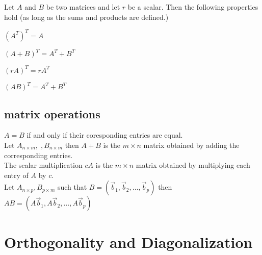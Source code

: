 \documentclass[5pt]{article}
\begin{document}
\begin{multicols}{2}
\begin{properties}
  Let $A$ and $B$ be two matrices and let $r$ be a scalar. Then the following properties hold (as long as the sums and products are defined.)
  \begin{itemize*}
    \item $(A^T)^T=A$
    \item $(A+B)^T=A^T+B^T$
    \item $(rA)^T=rA^T$
    \item $(AB)^T=A^T+B^T$
  \end{itemize*}
\end{properties}

\subsection{matrix operations}
$A=B$ if and only if their coresponding entries are equal.\\
Let $A_{n\times m},\;,B_{n\times m}$ then $A+B$ is the $m\times n$ matrix obtained by adding the corresponding entries.\\
The scalar multiplication $cA$ is  the $m\times n$ matrix obtained by multiplying each entry of $A$ by $c$.\\
Let $A_{n\times p}, B_{p\times m}$ such that $B=(\vec{b}_1, \vec{b}_2, \dots, \vec{b}_p)$ then $AB=(A\vec{b}_1, A\vec{b}_2, \dots, A\vec{b}_p)$


\section{Orthogonality and Diagonalization}

\end{multicols}
\end{document}

